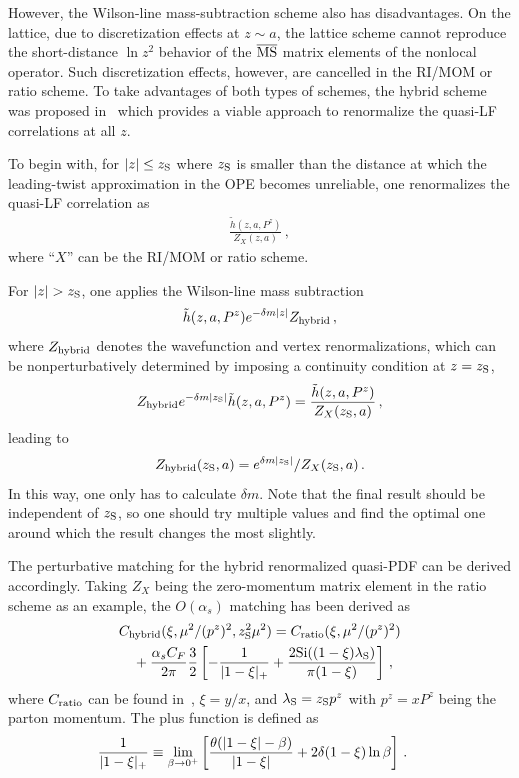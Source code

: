 However, the Wilson-line mass-subtraction scheme also has disadvantages. On the lattice, due to discretization effects at $z\sim a$, the lattice scheme cannot reproduce the short-distance $\ln z^2$ behavior of the ${\overline{\rm MS}}$ matrix elements of the nonlocal operator. Such discretization effects, however, are cancelled in the RI/MOM or ratio scheme. To take advantages of both types of schemes, the hybrid scheme was proposed in~\cite{Ji:2020brr} which provides a viable approach to renormalize the quasi-LF correlations at all $z$.


To begin with,
for $|z|\le z_{\rm S}$ where $z_{\rm S}$ is smaller than the distance at which the leading-twist approximation in the OPE becomes unreliable, one renormalizes the quasi-LF correlation as
\begin{align}\label{eq:ratio2}
	\frac{\tilde h(z,a,P^z)}{Z_X(z,a)}\,,
\end{align}
where ``$X$'' can be the RI/MOM or ratio scheme.

For $|z|>z_{\rm S}$, one applies the Wilson-line mass subtraction
\begin{align}
	{\tilde h(z,a,P^z)}e^{-\delta m |z|}Z_{\rm hybrid}\,,
\end{align}
where $Z_{\rm hybrid}$ denotes the wavefunction and vertex renormalizations, which can be nonperturbatively determined by imposing a continuity condition at $z=z_{\rm S}$,
\begin{align}
	Z_{\rm hybrid} e^{-\delta m |z_{\rm S}|}{\tilde h(z,a,P^z)}  = \frac{{\tilde h(z,a,P^z)}}{Z_X(z_{\rm S},a) }\,,
\end{align}
leading to
\begin{align}
	Z_{\rm hybrid}(z_{\rm S},a) = e^{\delta m |z_{\rm S}|}/{Z_X(z_{\rm S},a)  }\,.
\end{align}
In this way, one only has to calculate $\delta m$. Note that the final result should be independent of $z_{\rm S}$, so one should try multiple values and find the optimal one around which the result changes the most slightly.

The perturbative matching for the hybrid renormalized quasi-PDF can be derived accordingly. Taking $Z_X$ being the zero-momentum matrix element in the ratio scheme as an example, the $O(\alpha_s)$ matching has been derived as~\cite{Ji:2020brr}
\begin{align}\label{eq:hybridm2}
	&C_{\rm hybrid}(\xi, \mu^2/(p^z)^2, z_{\rm S}^2\mu^2) = C_{\rm ratio}(\xi, \mu^2/(p^z)^2) \nonumber\\
	&\quad+{\alpha_sC_F\over 2\pi}{3\over 2} \left[-{1\over |1-\xi|_+}+ \frac{2 \text{Si}((1-\xi) \lambda_{\rm S})}{\pi  (1-\xi)} \right]\,,
\end{align}
where $C_{\rm ratio}$ can be found in~\cite{Izubuchi:2018srq}, $\xi=y/x$, and $\lambda_{\rm S}=z_{\rm S}p^z$ with $p^z=xP^z$ being the parton momentum. The plus function is defined as
\begin{align}
	{1\over |1-\xi|_+} &\equiv \lim_{\beta\to0^+}\left[ {\theta(|1-\xi|-\beta)\over |1-\xi|} + 2\delta(1-\xi)\ln\beta\right] \,.
\end{align}


